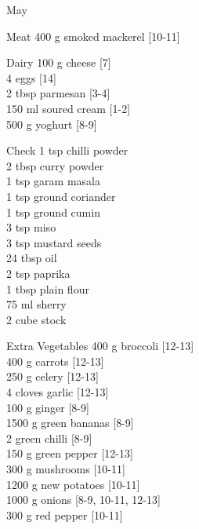 \begin{menu}{May}
\begin{shoppinglist}{Meat}
      400 g smoked mackerel {\scriptsize[10-11]}\\
      \end{shoppinglist}%
      \begin{shoppinglist}{Dairy}
      100 g cheese {\scriptsize[7]}\\
      4  eggs {\scriptsize[14]}\\
      2 tbsp parmesan {\scriptsize[3-4]}\\
      150 ml soured cream {\scriptsize[1-2]}\\
      500 g yoghurt {\scriptsize[8-9]}\\
      \end{shoppinglist}%
      \par\vfil %
      \vfil\clearpage %
      \begin{shoppinglist}{Check}
      1 tsp chilli powder \\
      2 tbsp curry powder \\
      1 tsp garam masala \\
      1 tsp ground coriander \\
      1 tsp ground cumin \\
      3 tsp miso \\
      3 tsp mustard seeds \\
      24 tbsp oil \\
      2 tsp paprika \\
      1 tbsp plain flour \\
      75 ml sherry \\
      2 cube stock \\
      \end{shoppinglist}%
      \begin{shoppinglist}{Extra Vegetables}
      400 g broccoli {\scriptsize[12-13]}\\
      400 g carrots {\scriptsize[12-13]}\\
      250 g celery {\scriptsize[12-13]}\\
      4 cloves garlic {\scriptsize[12-13]}\\
      100 g ginger {\scriptsize[8-9]}\\
      1500 g green bananas {\scriptsize[8-9]}\\
      2  green chilli {\scriptsize[8-9]}\\
      150 g green pepper {\scriptsize[12-13]}\\
      300 g mushrooms {\scriptsize[10-11]}\\
      1200 g new potatoes {\scriptsize[10-11]}\\
      1000 g onions {\scriptsize[8-9, 10-11, 12-13]}\\
      300 g red pepper {\scriptsize[10-11]}\\
      \end{shoppinglist}%
      \par\vfil %
    \vfil\clearpage
  

\end{menu}
